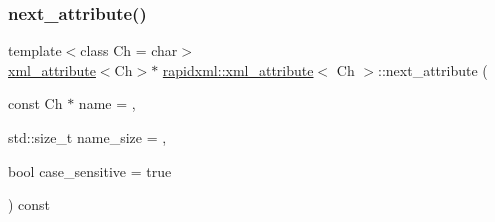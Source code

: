 \subsubsection{\texorpdfstring{next\_attribute()}{next\_attribute()}}
{\footnotesize\ttfamily template$<$class Ch = char$>$ \\
\mbox{\hyperlink{classrapidxml_1_1xml__attribute}{xml\+\_\+attribute}}$<$Ch$>$$\ast$ \mbox{\hyperlink{classrapidxml_1_1xml__attribute}{rapidxml\+::xml\+\_\+attribute}}$<$ Ch $>$\+::next\+\_\+attribute (\begin{DoxyParamCaption}\item[{const Ch $\ast$}]{name = {},  }\item[{std\+::size\+\_\+t}]{name\+\_\+size = {},  }\item[{bool}]{case\+\_\+sensitive = {\ttfamily true} }\end{DoxyParamCaption}) const\hspace{0.3cm}{\ttfamily [inline]}}

